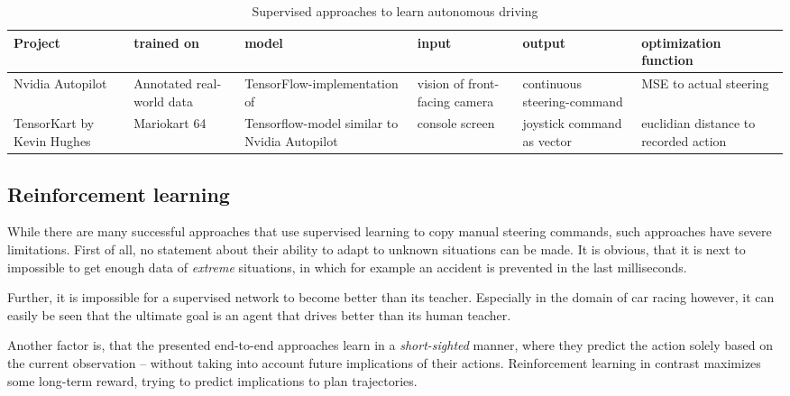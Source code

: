 \begin{table}[h]
	\renewcommand{\arraystretch}{1.2}
	\begin{flushleft}
		\scriptsize
		\begin{tabular}{P{1.6cm}P{1.9cm}P{2.2cm}P{2.5cm}P{2.5cm}P{2.3cm}}
			Project & trained on & model & input & output & optimization function \\
			\hline
			Nvidia Autopilot & Annotated real-world data & TensorFlow-implementation of \cite{bojarski_end_2016} & vision of front-facing camera & continuous steering-command & MSE to actual steering\\
			TensorKart by Kevin Hughes & Mariokart 64 & Tensorflow-model similar to Nvidia Autopilot & console screen & joystick command as vector & euclidian distance to recorded action\\
		\end{tabular}
	\end{flushleft}
	\caption{Supervised approaches to learn autonomous driving}
	\label{tb:svapproaches}
\end{table}

\subsection{Reinforcement learning}

While there are many successful approaches that use supervised learning to copy manual steering commands, such approaches have severe limitations. First of all, no statement about their ability to adapt to unknown situations can be made. It is obvious, that it is next to impossible to get enough data of \textit{extreme} situations, in which for example an accident is prevented in the last milliseconds.

Further, it is impossible for a supervised network to become better than its teacher. Especially in the domain of car racing however, it can easily be seen that the ultimate goal is an agent that drives better than its human teacher.

Another factor is, that the presented end-to-end approaches learn in a \textit{short-sighted} manner, where they predict the action solely based on the current observation -- without taking into account future implications of their actions. Reinforcement learning in contrast maximizes some long-term reward, trying to predict implications to plan trajectories.

